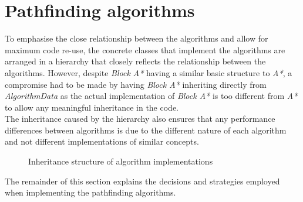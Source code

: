 \documentclass[12pt,notitlepage]{report}
\begin{document}
\section{Pathfinding algorithms}
To emphasise the close relationship between the algorithms and allow for maximum code re-use, the concrete classes that implement the algorithms are arranged in a hierarchy that closely reflects the relationship between the algorithms. However, despite {\em Block A*} having a similar basic structure to {\em A*}, a compromise had to be made by having {\em Block A*} inheriting directly from {\em AlgorithmData} as the actual implementation of {\em Block A*} is too different from {\em A*} to allow any meaningful inheritance in the code.\\

\noindent
The inheritance caused by the hierarchy also ensures that any performance differences between algorithms is due to the different nature of each algorithm and not different implementations of similar concepts.\\

\begin{figure}
\centering
{}
\caption{Inheritance structure of algorithm implementations}
\end{figure}

\noindent
The remainder of this section explains the decisions and strategies employed when implementing the pathfinding algorithms.
\end{document}
